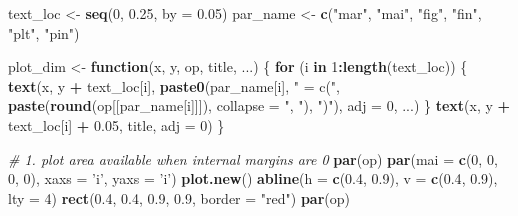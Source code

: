 \documentclass[
  11pt,
]{krantz}
\newenvironment{Shaded}{\begin{snugshade}}{\end{snugshade}}
\newcommand{\CommentTok}[1]{\textcolor[rgb]{0.37,0.37,0.37}{\textit{#1}}}
\newcommand{\ControlFlowTok}[1]{\textcolor[rgb]{0.27,0.27,0.27}{\textbf{#1}}}
\newcommand{\DataTypeTok}[1]{\textcolor[rgb]{0.27,0.27,0.27}{#1}}
\newcommand{\DecValTok}[1]{\textcolor[rgb]{0.06,0.06,0.06}{#1}}
\newcommand{\FloatTok}[1]{\textcolor[rgb]{0.06,0.06,0.06}{#1}}
\newcommand{\KeywordTok}[1]{\textcolor[rgb]{0.27,0.27,0.27}{\textbf{#1}}}
\newcommand{\NormalTok}[1]{#1}
\newcommand{\OperatorTok}[1]{\textcolor[rgb]{0.43,0.43,0.43}{\textbf{#1}}}
\newcommand{\StringTok}[1]{\textcolor[rgb]{0.5,0.5,0.5}{#1}}
\begin{document}
\begin{Shaded}
\begin{Highlighting}[]
\NormalTok{text_loc <-}\StringTok{ }\KeywordTok{seq}\NormalTok{(}\DecValTok{0}\NormalTok{, }\FloatTok{0.25}\NormalTok{, }\DataTypeTok{by =} \FloatTok{0.05}\NormalTok{)}
\NormalTok{par_name <-}\StringTok{ }\KeywordTok{c}\NormalTok{(}\StringTok{"mar"}\NormalTok{, }\StringTok{"mai"}\NormalTok{, }\StringTok{"fig"}\NormalTok{, }\StringTok{"fin"}\NormalTok{, }\StringTok{"plt"}\NormalTok{, }\StringTok{"pin"}\NormalTok{)}

\NormalTok{plot_dim <-}\StringTok{ }\ControlFlowTok{function}\NormalTok{(x, y, op, title, ...) \{}
  \ControlFlowTok{for}\NormalTok{ (i }\ControlFlowTok{in} \DecValTok{1}\OperatorTok{:}\KeywordTok{length}\NormalTok{(text_loc)) \{}
    \KeywordTok{text}\NormalTok{(x, y }\OperatorTok{+}\StringTok{ }\NormalTok{text_loc[i], }
         \KeywordTok{paste0}\NormalTok{(par_name[i], }\StringTok{" = c("}\NormalTok{, }
                \KeywordTok{paste}\NormalTok{(}\KeywordTok{round}\NormalTok{(op[[par_name[i]]]), }
                            \DataTypeTok{collapse =} \StringTok{", "}\NormalTok{), }\StringTok{")"}\NormalTok{), }
         \DataTypeTok{adj =} \DecValTok{0}\NormalTok{, ...)}
\NormalTok{  \}}
  \KeywordTok{text}\NormalTok{(x, y }\OperatorTok{+}\StringTok{ }\NormalTok{text_loc[i] }\OperatorTok{+}\StringTok{ }\FloatTok{0.05}\NormalTok{, title, }\DataTypeTok{adj =} \DecValTok{0}\NormalTok{)}
\NormalTok{\}}


\CommentTok{# 1. plot area available when internal margins are 0}
\KeywordTok{par}\NormalTok{(op)}
\KeywordTok{par}\NormalTok{(}\DataTypeTok{mai =} \KeywordTok{c}\NormalTok{(}\DecValTok{0}\NormalTok{, }\DecValTok{0}\NormalTok{, }\DecValTok{0}\NormalTok{, }\DecValTok{0}\NormalTok{), }\DataTypeTok{xaxs =} \StringTok{'i'}\NormalTok{, }\DataTypeTok{yaxs =} \StringTok{'i'}\NormalTok{)}
\KeywordTok{plot.new}\NormalTok{()}
\KeywordTok{abline}\NormalTok{(}\DataTypeTok{h =} \KeywordTok{c}\NormalTok{(}\FloatTok{0.4}\NormalTok{, }\FloatTok{0.9}\NormalTok{), }\DataTypeTok{v =} \KeywordTok{c}\NormalTok{(}\FloatTok{0.4}\NormalTok{, }\FloatTok{0.9}\NormalTok{), }\DataTypeTok{lty =} \DecValTok{4}\NormalTok{)}
\KeywordTok{rect}\NormalTok{(}\FloatTok{0.4}\NormalTok{, }\FloatTok{0.4}\NormalTok{, }\FloatTok{0.9}\NormalTok{, }\FloatTok{0.9}\NormalTok{, }\DataTypeTok{border =} \StringTok{"red"}\NormalTok{)}
\KeywordTok{par}\NormalTok{(op)}



\end{Highlighting}
\end{Shaded}
\end{document}
